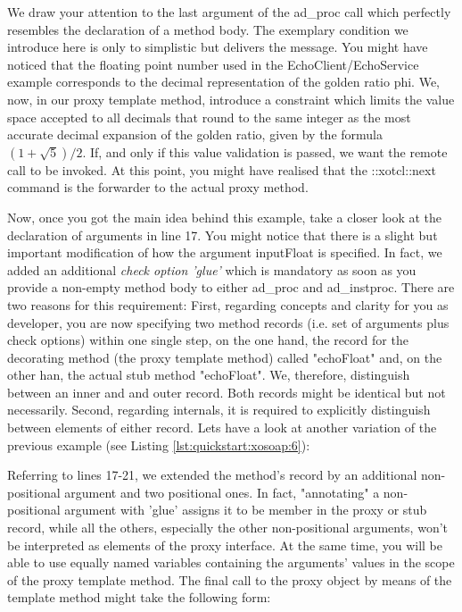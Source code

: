 We draw your attention to the last argument of the ad\_proc call which perfectly resembles the declaration of a method body. The exemplary condition we introduce here is only to simplistic but delivers the message. You might have noticed that the floating point number used in the EchoClient/EchoService example corresponds to the decimal representation of the golden ratio phi. We, now, in our proxy template method, introduce a constraint which limits the value space accepted to all decimals that round to the same integer as the most accurate decimal expansion of the golden ratio, given by the formula \begin{math} (1 + \sqrt{5}) / 2\end{math}. If, and only if this value validation is passed, we want the remote call to be invoked. At this point, you might have realised that the ::xotcl::next command is the forwarder to the actual proxy method. 

Now, once you got the main idea behind this example, take a closer look  at the declaration of arguments in line 17. You might notice that there is a slight but important modification of how the argument inputFloat is specified. In fact, we added an additional \emph{check option 'glue'} which is mandatory as soon as you provide a non-empty method body to either ad\_proc and ad\_instproc. There are two reasons for this requirement: First, regarding concepts and clarity for you as developer, you are now specifying two method records (i.e. set of arguments plus check options)  within one single step, on the one hand, the record for the decorating method (the proxy template method) called "echoFloat" and, on the other han, the actual stub method "echoFloat". We, therefore, distinguish between an inner and and outer record. Both records might be identical but not necessarily. Second, regarding internals, it is required to explicitly distinguish between elements of either record. Lets have a look at another variation of the previous example (see Listing \ref{lst:quickstart:xosoap:6}):



Referring to lines 17-21, we extended the method's record by an additional non-positional argument and two positional ones. In fact, "annotating" a non-positional argument with 'glue' assigns it to be member in the proxy or stub record, while all the others, especially the other non-positional arguments, won't be interpreted as elements of the proxy interface. At the same time, you will be able to use equally named variables containing the arguments' values in the scope of the proxy template method. The final call to the proxy object by means of the template method might take the following form:

